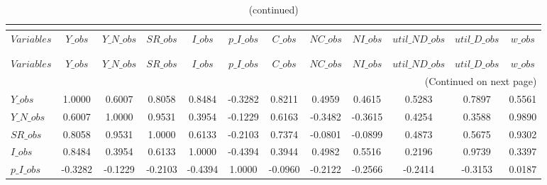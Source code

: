  
\begin{center}
\begin{longtable}{lccccccccccc} 
\caption{MATRIX OF CORRELATIONS}\\
 \label{Table:th_corr_matrix}\\
\toprule 
$Variables      $	 & 	 $          Y\_obs$	 & 	 $      Y\_N\_obs$	 & 	 $         SR\_obs$	 & 	 $          I\_obs$	 & 	 $      p\_I\_obs$	 & 	 $          C\_obs$	 & 	 $         NC\_obs$	 & 	 $         NI\_obs$	 & 	 $  util\_ND\_obs$	 & 	 $   util\_D\_obs$	 & 	 $          w\_obs$\\
\midrule \endfirsthead 
\caption{(continued)}\\
 \toprule \\ 
$Variables      $	 & 	 $          Y\_obs$	 & 	 $      Y\_N\_obs$	 & 	 $         SR\_obs$	 & 	 $          I\_obs$	 & 	 $      p\_I\_obs$	 & 	 $          C\_obs$	 & 	 $         NC\_obs$	 & 	 $         NI\_obs$	 & 	 $  util\_ND\_obs$	 & 	 $   util\_D\_obs$	 & 	 $          w\_obs$\\
\midrule \endhead 
\midrule \multicolumn{12}{r}{(Continued on next page)} \\ \bottomrule \endfoot 
\bottomrule \endlastfoot 
$Y\_obs         $	 & 	           1.0000	 & 	           0.6007	 & 	           0.8058	 & 	           0.8484	 & 	          -0.3282	 & 	           0.8211	 & 	           0.4959	 & 	           0.4615	 & 	           0.5283	 & 	           0.7897	 & 	           0.5561 \\ 
$Y\_N\_obs      $	 & 	           0.6007	 & 	           1.0000	 & 	           0.9531	 & 	           0.3954	 & 	          -0.1229	 & 	           0.6163	 & 	          -0.3482	 & 	          -0.3615	 & 	           0.4254	 & 	           0.3588	 & 	           0.9890 \\ 
$SR\_obs        $	 & 	           0.8058	 & 	           0.9531	 & 	           1.0000	 & 	           0.6133	 & 	          -0.2103	 & 	           0.7374	 & 	          -0.0801	 & 	          -0.0899	 & 	           0.4873	 & 	           0.5675	 & 	           0.9302 \\ 
$I\_obs         $	 & 	           0.8484	 & 	           0.3954	 & 	           0.6133	 & 	           1.0000	 & 	          -0.4394	 & 	           0.3944	 & 	           0.4982	 & 	           0.5516	 & 	           0.2196	 & 	           0.9739	 & 	           0.3397 \\ 
$p\_I\_obs      $	 & 	          -0.3282	 & 	          -0.1229	 & 	          -0.2103	 & 	          -0.4394	 & 	           1.0000	 & 	          -0.0960	 & 	          -0.2122	 & 	          -0.2566	 & 	          -0.2414	 & 	          -0.3153	 & 	           0.0187 \\ 

\end{longtable}
\end{center}

